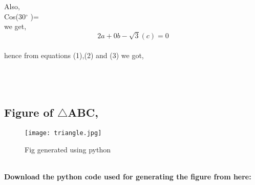 \documentclass[a4paper,12pt]{article}
\begin{document}
\begin{multicols}{2}
\setlength{\columnsep}{1.5cm}
\setlength{\columnseprule}{0.2pt}
Also,\\
 Cos(30$^{\circ}$ )= \\
       we get,\\
       
   
  \begin{equation}
    2a+0b-\sqrt{3}(c)=0
\end{equation}\\

hence from equations (1),(2) and (3) we got,\\


\\

\\

\\
\end{multicols}

\newpage

\subsection{Figure of $\triangle$ABC,}
\begin{figure}[htp]
    \centering
    \texttt{[image: triangle.jpg]}
    \caption{Fig generated using python}
    \label{fig:2}
\end{figure}
 \\
 
 \textbf{Download the python code used for generating the figure from here:}
 
\end{document}
